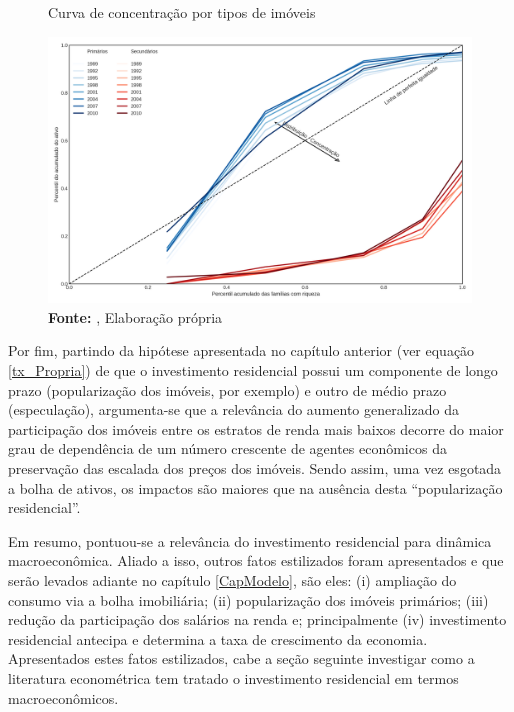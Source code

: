 \begin{figure}[H]
	\centering
	\caption{Curva de concentração por tipos de imóveis}
	\label{FigConcentracao}
	\includegraphics[width=\textwidth]{../../Dados/Fatos_Estilizados/figs/Concentracao_Imoveis.png}
	\caption*{\textbf{Fonte:} \textcite{us_census_bureau_characteristics_2017}, Elaboração própria}
\end{figure}
Por fim, partindo da hipótese apresentada no capítulo anterior (ver equação \ref{tx_Propria}) de que o investimento residencial possui um componente de longo prazo (popularização dos imóveis, por exemplo) e outro de médio prazo (especulação), argumenta-se que a relevância do aumento generalizado da participação dos imóveis entre os estratos de renda mais baixos decorre do maior grau de dependência de um número crescente de agentes econômicos da preservação das escalada dos preços dos imóveis.
Sendo assim, uma vez esgotada a bolha de ativos, os impactos são maiores que na ausência desta ``popularização residencial''.

Em resumo, pontuou-se a relevância do investimento residencial para dinâmica macroeconômica.
Aliado a isso, outros fatos estilizados foram apresentados e que serão levados adiante no capítulo \ref{CapModelo}, são eles:
	(i) ampliação do consumo via a bolha imobiliária;
	(ii) popularização dos imóveis primários;
	(iii) redução da participação dos salários na renda e; principalmente 
	(iv) investimento residencial antecipa e determina a taxa de crescimento da economia.
Apresentados estes fatos estilizados, cabe a seção seguinte investigar como a literatura econométrica tem tratado o investimento residencial em termos macroeconômicos.

